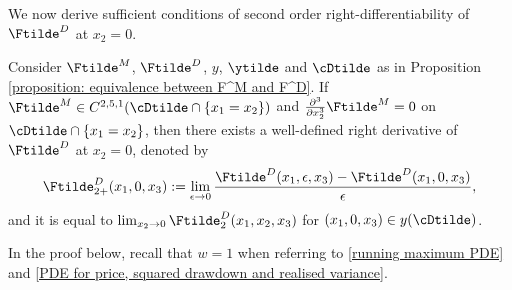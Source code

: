 \documentclass[11pt]{article}
\begin{document}
We now derive sufficient conditions of second order right-differentiability of $\Ftilde^D$ at $x_2 = 0$.

\begin{lemma}
\label{lemma: sufficient conditions for differentiability of F^D}

Consider $\Ftilde^M$, $\Ftilde^D$, $y$, $\ytilde$ and $\cDtilde$ as in Proposition \ref{proposition: equivalence between F^M and F^D}. If $\Ftilde^M \in C^{2,5,1}(\cDtilde \cap \{x_1 = x_2\})$ and $\frac{\partial^3}{\partial x_2^3} \Ftilde^M = 0$ on $\cDtilde \cap \{x_1 = x_2\}$, then there exists a well-defined right derivative of $\Ftilde^D$ at $x_2 = 0$, denoted by
$$
\Ftilde^D_{2+}(x_1,0,x_3) := \lim_{\epsilon \to 0} \frac{\Ftilde^D(x_1, \epsilon, x_3) - \Ftilde^D(x_1, 0, x_3)}{\epsilon},
$$
and it is equal to $\lim_{x_2 \to 0} \Ftilde^D_2(x_1, x_2, x_3)$ for $(x_1, 0, x_3) \in y(\cDtilde)$. 

\end{lemma}

In the proof below, recall that $w = 1$ when referring to  \eqref{running maximum PDE} and \eqref{PDE for price, squared drawdown and realised variance}.
\end{document}
